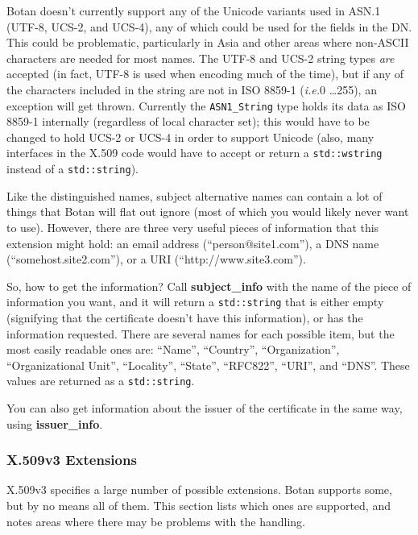\documentclass{article}
\newcommand{\function}[1]{\textbf{#1}}
\newcommand{\type}[1]{\texttt{#1}}
\newcommand{\ie}[0]{\emph{i.e.}}
\begin{document}
Botan doesn't currently support any of the Unicode variants used in
ASN.1 (UTF-8, UCS-2, and UCS-4), any of which could be used for the
fields in the DN. This could be problematic, particularly in Asia and
other areas where non-ASCII characters are needed for most names. The
UTF-8 and UCS-2 string types \emph{are} accepted (in fact, UTF-8 is
used when encoding much of the time), but if any of the characters
included in the string are not in ISO 8859-1 (\ie 0 \ldots 255), an
exception will get thrown. Currently the \type{ASN1\_String} type
holds its data as ISO 8859-1 internally (regardless of local character
set); this would have to be changed to hold UCS-2 or UCS-4 in order to
support Unicode (also, many interfaces in the X.509 code would have to
accept or return a \type{std::wstring} instead of a
\type{std::string}).

Like the distinguished names, subject alternative names can contain a
lot of things that Botan will flat out ignore (most of which you would
likely never want to use). However, there are three very useful pieces
of information that this extension might hold: an email address
(``person@site1.com''), a DNS name (``somehost.site2.com''), or a URI
(``http://www.site3.com'').

So, how to get the information? Call \function{subject\_info} with the
name of the piece of information you want, and it will return a
\type{std::string} that is either empty (signifying that the
certificate doesn't have this information), or has the information
requested. There are several names for each possible item, but the
most easily readable ones are: ``Name'', ``Country'',
``Organization'', ``Organizational Unit'', ``Locality'', ``State'',
``RFC822'', ``URI'', and ``DNS''. These values are returned as a
\type{std::string}.

You can also get information about the issuer of the certificate in the same
way, using \function{issuer\_info}.

\subsubsection{X.509v3 Extensions}

X.509v3 specifies a large number of possible extensions. Botan
supports some, but by no means all of them. This section lists which
ones are supported, and notes areas where there may be problems with
the handling.
\end{document}
